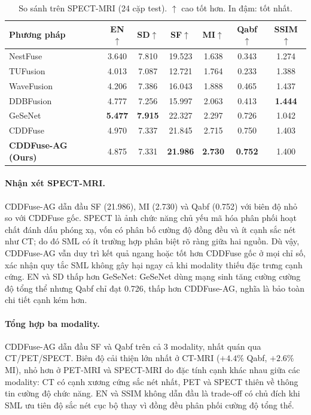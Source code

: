 \begin{table}[H]
\centering
\small
\caption[So sánh với SOTA trên SPECT-MRI (24 cặp test)]{So sánh trên SPECT-MRI (24 cặp test). $\uparrow$ cao tốt hơn. In đậm: tốt nhất.}
\label{tab:sota-spect}
\setlength{\tabcolsep}{4pt}
\begin{tabular}{lcccccc}
\toprule
\textbf{Phương pháp} & \textbf{EN}$\uparrow$ & \textbf{SD}$\uparrow$ & \textbf{SF}$\uparrow$ & \textbf{MI}$\uparrow$ & \textbf{Qabf}$\uparrow$ & \textbf{SSIM}$\uparrow$ \\
\midrule
NestFuse~\cite{li2020nestfuse}   & 3.640 & 7.810 & 19.523 & 1.638 & 0.343 & 1.274 \\
TUFusion~\cite{zhao2024tufusion} & 4.013 & 7.087 & 12.721 & 1.764 & 0.233 & 1.388 \\
WaveFusion~\cite{wang2025wavefusion} & 4.206 & 7.386 & 16.043 & 1.888 & 0.465 & 1.437 \\
DDBFusion~\cite{zhang2025ddbfusion}  & 4.777 & 7.256 & 15.997 & 2.063 & 0.413 & \textbf{1.444} \\
GeSeNet~\cite{li2023gesenet}    & \textbf{5.477} & \textbf{7.915} & 22.327 & 2.297 & 0.726 & 1.042 \\
CDDFuse~\cite{zhao2023cddfuse}  & 4.970 & 7.337 & 21.845 & 2.715 & 0.750 & 1.403 \\
\midrule
\textbf{CDDFuse-AG (Ours)} & 4.875 & 7.331 & \textbf{21.986} & \textbf{2.730} & \textbf{0.752} & 1.400 \\
\bottomrule
\end{tabular}
\end{table}

\paragraph{Nhận xét SPECT-MRI.}
CDDFuse-AG dẫn đầu SF (21.986), MI (2.730) và Qabf (0.752) với biên độ nhỏ so với CDDFuse gốc. SPECT là ảnh chức năng chủ yếu mã hóa phân phối hoạt chất đánh dấu phóng xạ, vốn có phân bố cường độ đồng đều và ít cạnh sắc nét như CT; do đó SML có ít trường hợp phân biệt rõ ràng giữa hai nguồn. Dù vậy, CDDFuse-AG vẫn duy trì kết quả ngang hoặc tốt hơn CDDFuse gốc ở mọi chỉ số, xác nhận quy tắc SML không gây hại ngay cả khi modality thiếu đặc trưng cạnh cứng. EN và SD thấp hơn GeSeNet: GeSeNet dùng mạng sinh tăng cường cường độ tổng thể nhưng Qabf chỉ đạt 0.726, thấp hơn CDDFuse-AG, nghĩa là bảo toàn chi tiết cạnh kém hơn.

\paragraph{Tổng hợp ba modality.}
CDDFuse-AG dẫn đầu SF và Qabf trên cả 3 modality, nhất quán qua CT/PET/SPECT. Biên độ cải thiện lớn nhất ở CT-MRI ($+4.4\%$ Qabf, $+2.6\%$ MI), nhỏ hơn ở PET-MRI và SPECT-MRI do đặc tính cạnh khác nhau giữa các modality: CT có cạnh xương cứng sắc nét nhất, PET và SPECT thiên về thông tin cường độ chức năng. EN và SSIM không dẫn đầu là trade-off có chủ đích khi SML ưu tiên độ sắc nét cục bộ thay vì đồng đều phân phối cường độ tổng thể.

